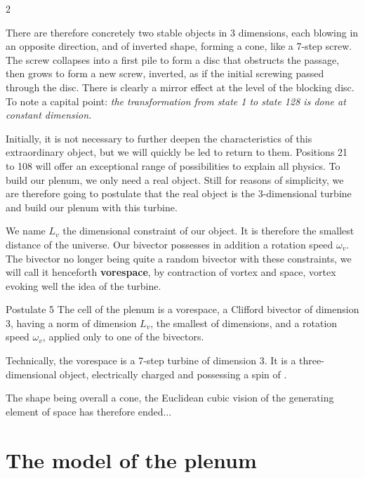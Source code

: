\begin{multicols}{2}
	
	There are therefore concretely two stable objects in 3 dimensions, each 
	blowing in an opposite direction, and of inverted shape, forming a 
	cone, like a 7-step screw. The screw collapses into a first pile 
	to form a disc that obstructs the passage, then grows to form a 
	new screw, inverted, as if the initial screwing passed through the 
	disc. There is clearly a mirror effect at the level of the 
	blocking disc. To note a capital point:\textit{ the transformation from state 1 to 
		state 128 is done at constant dimension.}
	
	Initially, it is not necessary to further deepen 
	the characteristics of this extraordinary object, but we will 
	quickly be led to return to them. Positions 21 to 108 will offer an 
	exceptional range of possibilities to explain all physics. 
	To build our plenum, we only need a real object. 
	Still for reasons of simplicity, we are therefore going to postulate that 
	the real object is the 3-dimensional turbine and build our plenum 
	with this turbine.
	
	We name $L_v$ the dimensional constraint of our object. It is therefore 
	the smallest distance of the universe. Our bivector possesses in addition 
	a rotation speed $\omega_v$. The bivector no longer being quite a 
	random bivector with these constraints, we will call it henceforth 
	\textbf{vorespace}, by contraction of vortex and space, vortex evoking well 
	the idea of the turbine.
	
	\begin{mybox}[breakable,colback=blue!10, colbacktitle=pkcolor]{Postulate 5}
		The cell of the plenum is a vorespace, a Clifford bivector of 
		dimension 3, having a norm of dimension $L_v$, the smallest of 
		dimensions, and a rotation speed $\omega_v$, applied only to 
		one of the bivectors.
	\end{mybox}
	\medskip
	
	Technically, the vorespace is a 7-step turbine of dimension 3. 
	It is a three-dimensional object, electrically charged and possessing a 
	spin of .
	\medskip
	
	The shape being overall a cone, the Euclidean cubic vision of 
	the generating element of space has therefore ended$\dots$
	
	
	\section{The model of the plenum}
	

\end{multicols}
